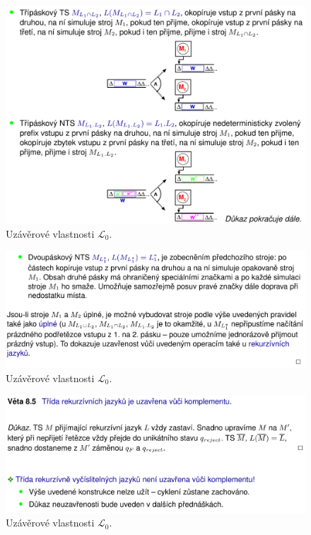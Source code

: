 \begin{figure}[H]
    \centering
    \includegraphics[width=1\linewidth]{uzaverove_vlasnosti_L0_02.pdf}
    \caption{Uzávěrové vlastnosti $\mathcal{L}_0$.}
\end{figure}

\begin{figure}[H]
    \centering
    \includegraphics[width=1\linewidth]{uzaverove_vlasnosti_L0_03.pdf}
    \caption{Uzávěrové vlastnosti $\mathcal{L}_0$.}
\end{figure}

\begin{figure}[H]
    \centering
    \includegraphics[width=1\linewidth]{uzaverove_vlasnosti_L0_04.pdf}
    \caption{Uzávěrové vlastnosti $\mathcal{L}_0$.}
\end{figure}


